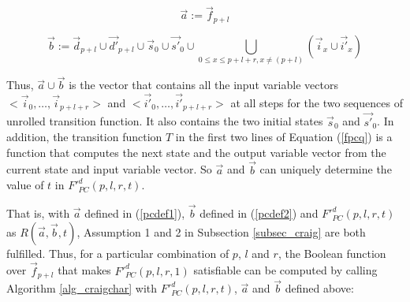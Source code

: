 \documentclass[runningheads,a4paper,orivec]{llncs}
\begin{document}
% 


\begin{equation}\label{pcdef1}
\vec{a}:=\vec{f}_{p+l}
\end{equation}

\begin{equation}\label{pcdef2}
\vec{b}:=\vec{d}_{p+l}\cup \vec{d'}_{p+l}\cup \vec{s}_0\cup \vec{s'}_0\cup\bigcup_{0\le x\le p+l+r,x\neq (p+l)}(\vec{i}_{x}\cup\vec{i'}_{x})
\end{equation}

Thus,
$\vec{a}\cup\vec{b}$ is the vector that contains all the input variable vectors $<\vec{i}_0,\dots,\vec{i}_{p+l+r}>$ and $<\vec{i'}_0,\dots,\vec{i'}_{p+l+r}>$
at all steps for the two sequences of unrolled transition function.
It also contains the two initial states $\vec{s}_0$ and $\vec{s'}_0$.
In addition,
the transition function $T$ in the first two lines of Equation (\ref{fpcq})
is a function that computes the next state and the output variable vector from the current state and input variable vector.
So $\vec{a}$ and $\vec{b}$ can uniquely determine the value of $t$ in $F'^d_{PC}(p,l,r,t)$.

That is,
with $\vec{a}$ defined in (\ref{pcdef1}),
$\vec{b}$ defined in (\ref{pcdef2})
and $F'^d_{PC}(p,l,r,t)$ as $R(\vec{a},\vec{b},t)$,
Assumption 1 and 2 in Subsection \ref{subsec_craig} are both fulfilled.
Thus,
for a particular combination of $p$, $l$ and $r$,
the Boolean function over $\vec{f}_{p+l}$ that makes $F'^d_{PC}(p,l,r,1)$ satisfiable can be computed 
by calling Algorithm \ref{alg_craigchar} with $F'^d_{PC}(p,l,r,t)$, $\vec{a}$ and $\vec{b}$ defined above:
\end{document}
